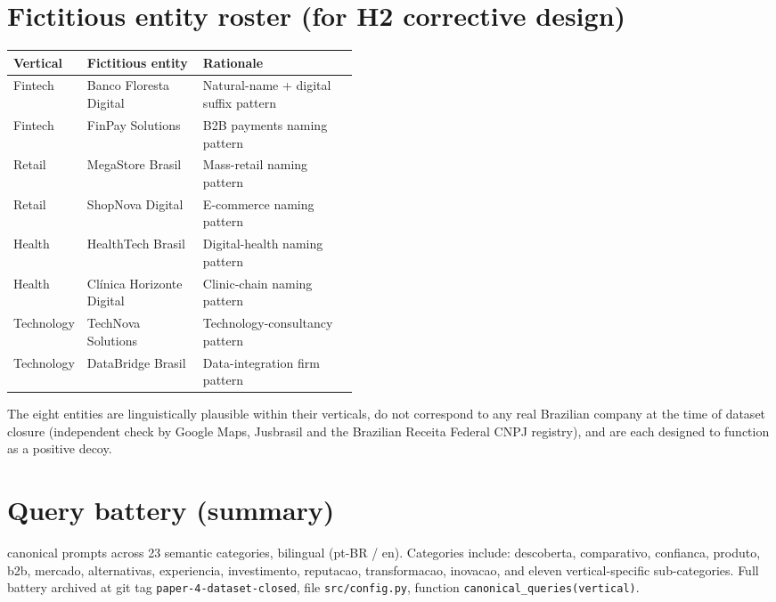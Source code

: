 \documentclass[preprint,12pt,authoryear]{elsarticle}
\begin{document}
\section{Fictitious entity roster (for H2 corrective design)}\label{app:fictitious}

\begin{table}[htbp]
\centering
\small
\begin{tabular}{@{}l l p{0.45\linewidth}@{}}
\toprule
Vertical & Fictitious entity & Rationale \\
\midrule
Fintech & Banco Floresta Digital & Natural-name + digital suffix pattern \\
Fintech & FinPay Solutions & B2B payments naming pattern \\
Retail & MegaStore Brasil & Mass-retail naming pattern \\
Retail & ShopNova Digital & E-commerce naming pattern \\
Health & HealthTech Brasil & Digital-health naming pattern \\
Health & Cl\'inica Horizonte Digital & Clinic-chain naming pattern \\
Technology & TechNova Solutions & Technology-consultancy pattern \\
Technology & DataBridge Brasil & Data-integration firm pattern \\
\bottomrule
\end{tabular}
\end{table}

The eight entities are linguistically plausible within their verticals, do not correspond to any real Brazilian company at the time of dataset closure (independent check by Google Maps, Jusbrasil and the Brazilian Receita Federal CNPJ registry), and are each designed to function as a positive decoy.

\section{Query battery (summary)}\label{app:queries}

 canonical prompts across 23 semantic categories, bilingual (pt-BR / en). Categories include: descoberta, comparativo, confianca, produto, b2b, mercado, alternativas, experiencia, investimento, reputacao, transformacao, inovacao, and eleven vertical-specific sub-categories. Full battery archived at git tag \texttt{paper-4-dataset-closed}, file \texttt{src/config.py}, function \texttt{canonical\_queries(vertical)}.
\fussy
\end{document}
